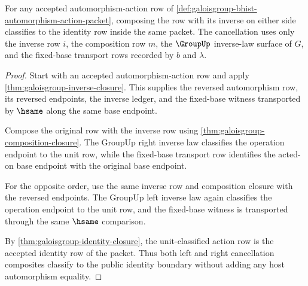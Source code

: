 \begin{theorem}
\label{thm:galoisgroup-inverse-cancellation-boundary}
For any accepted automorphism-action row of
\autoref{def:galoisgroup-bhist-automorphism-action-packet}, composing the row
with its inverse on either side classifies to the identity row inside the same
packet. The cancellation uses only the inverse row $i$, the composition row
$m$, the $\GroupUp$ inverse-law surface of $G$, and the fixed-base transport
rows recorded by $b$ and $\lambda$.
\end{theorem}
\begin{proof}
Start with an accepted automorphism-action row and apply
\autoref{thm:galoisgroup-inverse-closure}. This supplies the reversed
automorphism row, its reversed endpoints, the inverse ledger, and the
fixed-base witness transported by $\hsame$ along the same base endpoint.

Compose the original row with the inverse row using
\autoref{thm:galoisgroup-composition-closure}. The GroupUp right inverse law
classifies the operation endpoint to the unit row, while the fixed-base
transport row identifies the acted-on base endpoint with the original base
endpoint.

For the opposite order, use the same inverse row and composition closure with
the reversed endpoints. The GroupUp left inverse law again classifies the
operation endpoint to the unit row, and the fixed-base witness is transported
through the same $\hsame$ comparison.

By \autoref{thm:galoisgroup-identity-closure}, the unit-classified action row
is the accepted identity row of the packet. Thus both left and right
cancellation composites classify to the public identity boundary without
adding any host automorphism equality.
\end{proof}

